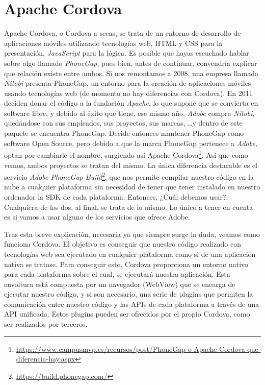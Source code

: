 \section{Apache Cordova}

Apache Cordova, o Cordova a secas, se trata de un entorno de desarrollo de aplicaciones móviles utilizando tecnologías web, \gls{HTML} y \gls{CSS} para la presentación, \emph{JavaScript} para la lógica. Es posible que hayas escuchado hablar sobre algo llamado \emph{PhoneGap}, pues bien, antes de continuar, convendría explicar que relación existe entre ambos. Si nos remontamos a 2008, una empresa llamada \emph{Nitobi} presenta PhoneGap, un entorno para la creación de aplicaciones móviles usando tecnologías web (de momento no hay diferencias con Cordova). En 2011 deciden donar el código a la fundación \emph{Apache}, lo que supone que se convierta en software libre, y debido al éxito que tiene, ese mismo año, \emph{Adobe} compra \emph{Nitobi}, quedándose con sus empleados, sus proyectos, sus marcas, \ldots y dentro de este paquete se encuentra PhoneGap. Decide entonces mantener PhoneGap como software Open Source, pero debido a que la marca PhoneGap pertenece a \emph{Adobe}, optan por cambiarle el nombre, surgiendo así Apache Cordova\footnote{\url{https://www.campusmvp.es/recursos/post/PhoneGap-o-Apache-Cordova-que-diferencia-hay.aspx}}. Así que como vemos, ambos proyectos se tratan del mismo. La única diferencia destacable es el servicio \emph{Adobe PhoneGap Build}\footnote{\url{https://build.phonegap.com/}}, que nos permite compilar nuestro código en la nube a cualquier plataforma sin necesidad de tener que tener instalado en nuestro ordenador la SDK de cada plataforma. Entonces, ¿Cuál debemos usar?. Cualquiera de los dos, al final, se trata de lo mismo. Lo único a tener en cuenta es si vamos a usar alguno de los servicios que ofrece Adobe.

Tras esta breve explicación, necesaria ya que siempre surge la duda, veamos como funciona Cordova. El objetivo es conseguir que nuestro código realizado con tecnologías web sea ejecutado en cualquier plataforma como si de una aplicación nativa se tratase. Para conseguir esto, Cordova proporciona un entorno nativo para cada plataforma sobre el cual, se ejecutará nuestra aplicación. Esta envoltura está compuesta por un navegador (WebView) que se encarga de ejecutar nuestro código, y si son necesario, una serie de plugins que permiten la comunicación entre nuestro código y las \glspl{API} de cada plataforma a través de una \gls{API} unificada. Estos plugins pueden ser ofrecidos por el propio Cordova, como ser realizados por terceros.

